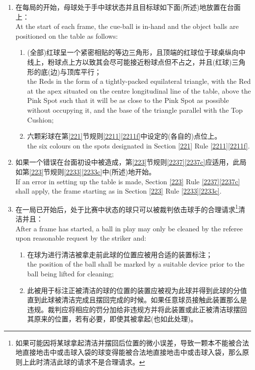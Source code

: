 \begin{enumerate}[label=(\alph*)]
    \item 在每局的开始，母球处于手中球状态并且目标球如下面(所述)地放置在台面上：\\
    At the start of each frame, the cue-ball is in-hand and the object balls are positioned on the table as follows:
    \begin{enumerate}[label=(\roman*)]
        \item (全部)红球呈一个紧密相贴的等边三角形，且顶端的红球位于球桌纵向中线上，粉球点上方以致其会尽可能接近粉球点但不占之，并且(红球)三角形的底(边)与顶库平行；\\
        the Reds in the form of a tightly-packed equilateral triangle, with the Red at the apex situated on the centre longitudinal line of the table, above the Pink Spot such that it will be as close to the Pink Spot as possible without occupying it, and the base of the triangle parallel with the Top Cushion;
        \item 六颗彩球在第\ref{221}节规则\ref{2211}\ref{2211f}中设定的(各自的)点位上。\\
        the six colours on the spots designated in Section \ref{221} Rule \ref{2211}\ref{2211f}.
    \end{enumerate}
    \item 如果一个错误在台面初设中被造成，第\ref{223}节规则\ref{2237}\ref{2237c}应适用，此局如第\ref{223}节规则\ref{2233}\ref{2233c}中(所述)地开始。\\
    If an error in setting up the table is made, Section \ref{223} Rule \ref{2237}\ref{2237c} shall apply, the frame starting as in Section \ref{223} Rule \ref{2233}\ref{2233c}.
    \item \label{2232c}在一局已开始后，处于比赛中状态的球只可以被裁判依击球手的合理请求\footnote{如果可能因将某球拿起清洁并摆回后位置的微小误差，导致一颗本不能被合法地直接地击中或击球入袋的球变得能被合法地直接地击中或击球入袋，那么原则上此时清洁此球的请求不是合理请求。}清洁并且：\\
    After a frame has started, a ball in play may only be cleaned by the referee upon reasonable request by the striker and:
    \begin{enumerate}[label=(\roman*)]
        \item 在球为进行清洁被拿走前此球的位置应被用合适的装置标注；\\
        the position of the ball shall be marked by a suitable device prior to the ball being lifted for cleaning;
        \item \label{2232cii}此被用于标注正被清洁的球的位置的装置应被视为此球并得到此球的分值直到此球被清洁完成且摆回完成的时候。如果任意球员接触此装置那么是违规。裁判应将相应的罚分加给非违规方并将此装置或此正被清洁球摆回其原来的位置，若有必要，即使其被拿起(也如此处理)。\\

\end{enumerate}
\end{enumerate}
